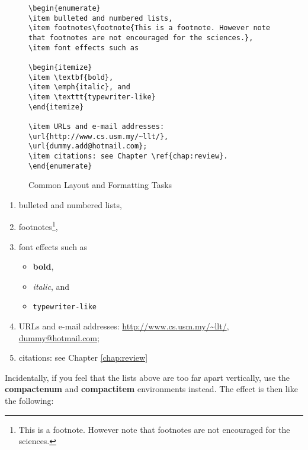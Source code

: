 \begin{figure}[htb!]
\begin{lstlisting}
\begin{enumerate}
\item bulleted and numbered lists, 
\item footnotes\footnote{This is a footnote. However note that footnotes are not encouraged for the sciences.}, 
\item font effects such as

\begin{itemize}
\item \textbf{bold}, 
\item \emph{italic}, and 
\item \texttt{typewriter-like}
\end{itemize}

\item URLs and e-mail addresses: \url{http://www.cs.usm.my/~llt/}, \url{dummy.add@hotmail.com};
\item citations: see Chapter \ref{chap:review}.
\end{enumerate}
\end{lstlisting}
\caption{Common Layout and Formatting Tasks}\label{fig:simple}
\end{figure}

\begin{enumerate}
\item bulleted and numbered lists, 
\item footnotes\footnote{This is a footnote. However note that footnotes are not encouraged for the sciences.}, 
\item font effects such as

\begin{itemize}
\item \textbf{bold}, 
\item \emph{italic}, and 
\item \texttt{typewriter-like}
\end{itemize}

\item URLs and e-mail addresses: \url{http://www.cs.usm.my/~llt/}, \url{dummy@hotmail.com};
\item citations: see Chapter \ref{chap:review}
\end{enumerate}

Incidentally, if you feel that the lists above are too far apart vertically, use the \textbf{compactenum} and \textbf{compactitem} environments instead.  The effect is then like the following:

